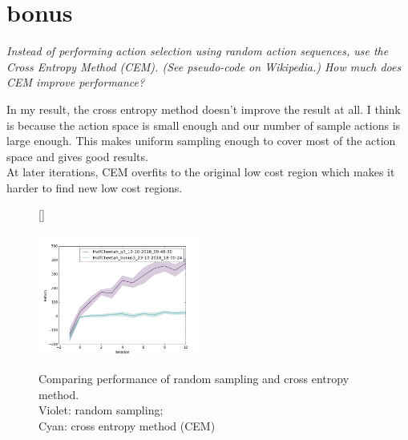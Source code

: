 \documentclass[12pt]{article}
\begin{document}
  \pagebreak
  \section{bonus}
  \textit{Instead of performing action selection using random action sequences, use
  	the Cross Entropy Method (CEM). (See pseudo-code on Wikipedia.) How
  	much does CEM improve performance?}
  
  In my result, the cross entropy method doesn't improve the result at all.  I think is because the action space is small enough and our number of sample actions is large enough.  This makes uniform sampling enough to cover most of the action space and gives good results.\\
  At later iterations, CEM overfits to the original low cost region which makes it harder to find new low cost regions.
  
  \begin{figure}[!htbp]
  	[\FBwidth]
  	{\caption[caption]{
  			Comparing performance of random sampling and cross entropy method. \\ \hspace{0.4\textwidth}
  			Violet: random sampling; \\ \hspace{0.4\textwidth}
  			Cyan: cross entropy method (CEM)
  	}\label{fig:bonus3}}
  	{\includegraphics[width=0.48\textwidth]{bonus3.png}}
  \end{figure}
  
\end{document}
